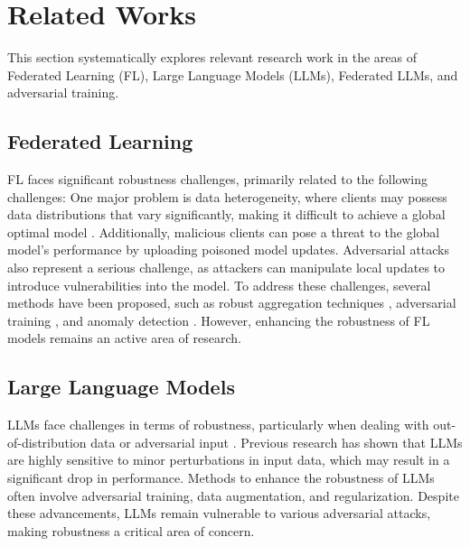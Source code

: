 \section{Related Works}
\label{sec2}
This section systematically explores relevant research work in the areas of Federated Learning (FL), Large Language Models (LLMs), Federated LLMs, and adversarial training.

\subsection{Federated Learning}



FL faces significant robustness challenges, primarily related to the following challenges: One major problem is data heterogeneity, where clients may possess data distributions that vary significantly, making it difficult to achieve a global optimal model \cite{lyu2022privacy}. Additionally, malicious clients \cite{li2020learning} can pose a threat to the global model’s performance by uploading poisoned model updates. Adversarial attacks \cite{pmlr-v97-bhagoji19a} also represent a serious challenge, as attackers can manipulate local updates to introduce vulnerabilities into the model. To address these challenges, several methods have been proposed, such as robust aggregation techniques \cite{pillutla2022robust}, adversarial training \cite{zizzo2020fat}, and anomaly detection \cite{mothukuri2021federated}. However, enhancing the robustness of FL models remains an active area of research.

\subsection{Large Language Models}

LLMs face challenges in terms of robustness, particularly when dealing with out-of-distribution data or adversarial input \cite{liu2023trustworthy,minaee2024largelanguagemodelssurvey}. Previous research has shown that LLMs are highly sensitive to minor perturbations in input data, which may result in a significant drop in performance. Methods to enhance the robustness of LLMs often involve adversarial training, data augmentation, and regularization. Despite these advancements, LLMs remain vulnerable to various adversarial attacks, making robustness a critical area of concern.

